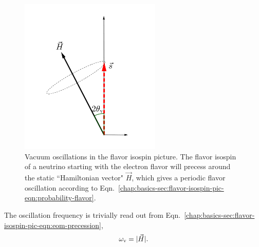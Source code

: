 \begin{figure}
    \centering
    \vspace*{-20pt}
    \includegraphics[width=0.6\textwidth]{chapters/assets/basics/flavor-isospin-vac-osc}
    \caption{Vacuum oscillations in the flavor isospin picture. The flavor isospin of a neutrino starting with the electron flavor will precess around the static ``Hamiltonian vector" $\vec H$, which gives a periodic flavor oscillation according to Eqn.~\ref{chap:basics-sec:flavor-isospin-pic-eqn:probability-flavor}.}
    \label{chap:basics-sec:flavor-isospin-pic-fig:flavor-isospin-vac-osc}
\end{figure}
The oscillation frequency is trivially read out from Eqn.~\ref{chap:basics-sec:flavor-isospin-pic-eqn:eom-precession},
\begin{equation}
\omega_\mathrm v = \lvert \vec{H} \rvert.
\end{equation}




